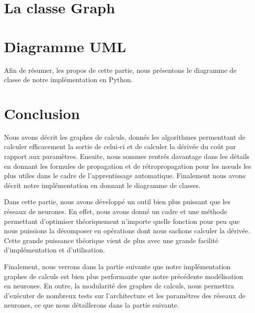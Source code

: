 \section{La classe Graph}


\section{Diagramme UML}

Afin de résumer, les propos de cette partie, nous présentons le diagramme de classe de notre implémentation en Python.


\section{Conclusion}

Nous avons décrit les graphes de calculs, donnés les algorithmes permenttant de calculer efficacement la sortie de celui-ci et de calculer la dérivée du coût par rapport aux paramètres. Ensuite, nous sommes rentrés davantage dans les détails en donnant les formules de propagation et de rétropropagation pour les n\oe{}uds les plus utiles dans le cadre de l'apprentissage automatique. Finalement nous avons décrit notre implémentation en donnant le diagramme de classes.

Dans cette partie, nous avons développé un outil bien plus puissant que les réseaux de neurones. En effet, nous avons donné un cadre et une méthode permettant d'optimiser théoriquement n'importe quelle fonction pour peu que nous puissions la décomposer en opérations dont nous sachons calculer la dérivée. Cette grande puissance théorique vient de plus avec une grande facilité d'implémentation et d'utilisation.

Finalement, nous verrons dans la partie suivante que notre implémentation graphes de calculs est bien plus performante que notre précédente modélisation en neurones. En outre, la modularité des graphes de calculs, nous permettra d'exécuter de nombreux tests sur l'architecture et les paramètres des réseaux de neurones, ce que nous détaillerons dans la partie suivante.